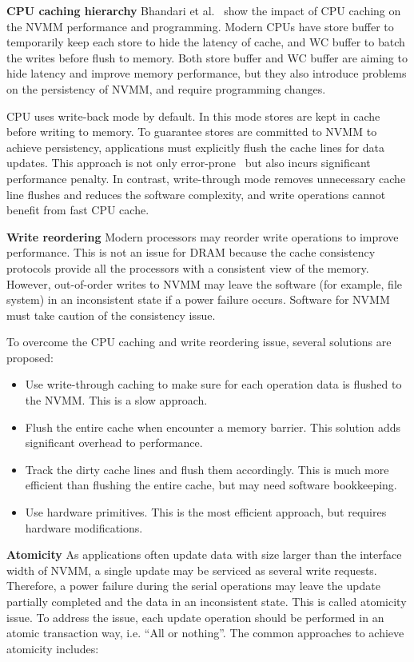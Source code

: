 \textbf{CPU caching hierarchy}
Bhandari et al.~\cite{CPUcaching} show the impact of CPU caching on the
 NVMM performance
and programming. Modern CPUs have store buffer to temporarily keep each store
to hide the latency of cache, and WC buffer to batch the writes before
flush to memory. Both store buffer and WC buffer are aiming to hide latency
and improve memory performance, but they also introduce problems on the
persistency of NVMM, and require programming changes.

CPU uses write-back mode by default. In this mode stores are kept in cache
before writing to memory. To guarantee stores are committed to NVMM to achieve
persistency, applications must explicitly flush the cache lines for data
updates. This approach is not only error-prone~\cite{singlelock}
but also incurs significant
performance penalty. In contrast, write-through mode removes unnecessary
cache line flushes and reduces the software complexity, and write operations
cannot benefit from fast CPU cache.

\textbf{Write reordering} Modern processors may reorder write operations to improve
performance. This is not an issue for DRAM because the cache consistency
protocols provide all the processors with a consistent view of the memory.
However, out-of-order writes to NVMM may leave the software (for example,
file system) in an inconsistent state if a power failure occurs. Software
for NVMM must take caution of the consistency issue. 

To overcome the CPU caching and write reordering issue,
several solutions are proposed:

\begin{itemize}
\item Use write-through caching to make sure for each operation
data is flushed to the NVMM. This is a slow approach. 
\item Flush the entire cache when encounter a memory barrier. This solution
adds significant overhead to performance.
\item Track the dirty cache lines and flush them accordingly. This is much
more efficient than flushing the entire cache, but may need software bookkeeping.
\item Use hardware primitives. This is the most efficient approach, but requires
hardware modifications.
\end{itemize}

\textbf{Atomicity}
As applications often update data with size larger than the interface width
of NVMM, a single update may be serviced as several write requests. Therefore,
a power failure during the serial operations may leave the update partially
completed and the data in an inconsistent state. This is called atomicity issue.
To address the issue, each update operation should be performed in an atomic
transaction way, i.e. ``All or nothing''.
The common approaches to achieve atomicity includes:

